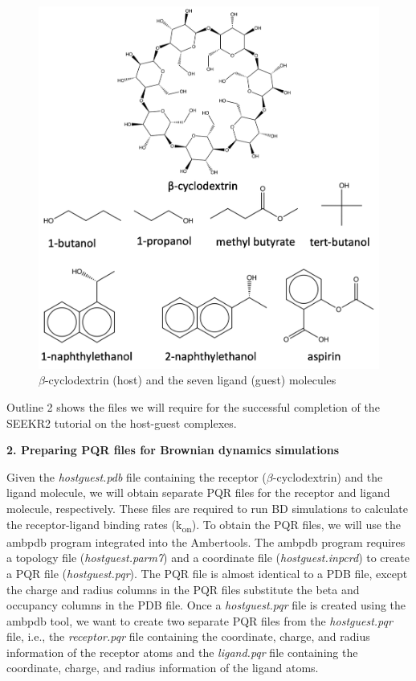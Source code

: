 \documentclass[9pt,training,pubversion]{livecoms}
\begin{document}
\begin{figure}[H]
\centering
\includegraphics[scale=0.45]{images/figure4.png} 
\caption{$\beta$-cyclodextrin (host) and the seven ligand (guest) molecules}
\label{figure4}
\end{figure} 

\noindent Outline 2 shows the files we will require for the successful completion of the SEEKR2 tutorial on the host-guest complexes.

\vspace{2mm}
\noindent \textbf{2. Preparing PQR files for Brownian dynamics simulations} \par
\vspace{2mm}

\noindent Given the \textit{hostguest.pdb} file containing the receptor ($\beta$-cyclodextrin) and the ligand molecule, we will obtain separate PQR files for the receptor and ligand molecule, respectively. These files are required to run BD simulations to calculate the receptor-ligand binding rates (k\textsubscript{on}). To obtain the PQR files, we will use the ambpdb program integrated into the Ambertools. The ambpdb program requires a topology file (\textit{hostguest.parm7}) and a coordinate file (\textit{hostguest.inpcrd}) to create a PQR file (\textit{hostguest.pqr}). The PQR file is almost identical to a PDB file, except the charge and radius columns in the PQR files substitute the beta and occupancy columns in the PDB file. Once a \textit{hostguest.pqr} file is created using the ambpdb tool, we want to create two separate PQR files from the \textit{hostguest.pqr} file, i.e., the \textit{receptor.pqr} file containing the coordinate, charge, and radius information of the receptor atoms and the \textit{ligand.pqr} file containing the coordinate, charge, and radius information of the ligand atoms. \par
\end{document}
